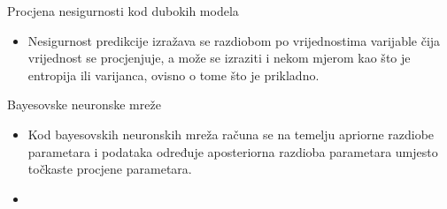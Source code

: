 \documentclass{beamer}
\begin{document}
\begin{frame}{Procjena nesigurnosti kod dubokih modela}
\begin{itemize}
	\item Nesigurnost predikcije izražava se razdiobom po vrijednostima varijable čija vrijednost se procjenjuje, a može se izraziti i nekom mjerom kao što je entropija ili varijanca, ovisno o tome što je prikladno.
\end{itemize}
\end{frame}

\begin{frame}{Bayesovske neuronske mreže}
\begin{itemize}
	\item Kod bayesovskih neuronskih mreža računa se na temelju apriorne razdiobe parametara i podataka određuje aposteriorna razdioba parametara umjesto točkaste procjene parametara.
	\item 
\end{itemize}
\end{frame}


 
\end{document}

